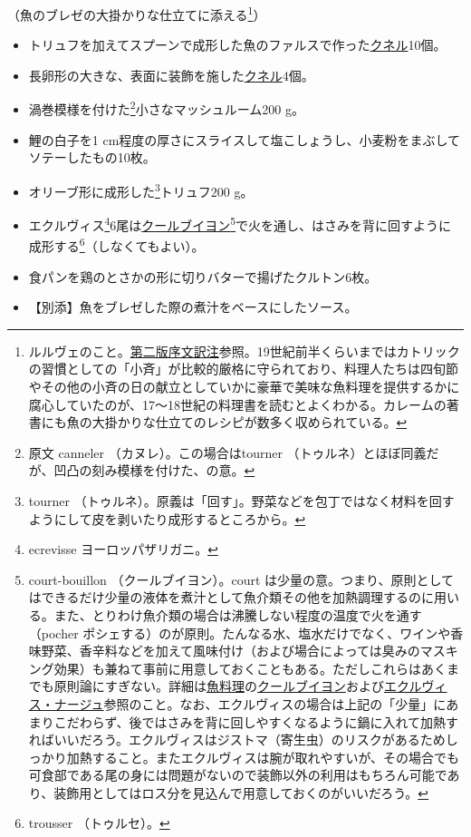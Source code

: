 \begin{recette}


（魚のブレゼの大掛かりな仕立てに添える\footnote{ルルヴェのこと。\protect\hyperlink{releve}{第二版序文訳注}参照。19世紀前半くらいまではカトリックの習慣としての「小斉」が比較的厳格に守られており、料理人たちは四旬節やその他の小斉の日の献立としていかに豪華で美味な魚料理を提供するかに腐心していたのが、17〜18世紀の料理書を読むとよくわかる。カレームの著書にも魚の大掛かりな仕立てのレシピが数多く収められている。}）

\begin{itemize}
\item
  トリュフを加えてスプーンで成形した魚のファルスで作った\protect\hyperlink{quenelles}{クネル}10個。
\item
  長卵形の大きな、表面に装飾を施した\protect\hyperlink{quenelles}{クネル}4個。
\item
  渦巻模様を付けた\footnote{原文 canneler （カヌレ）。この場合はtourner
    （トゥルネ）とほぼ同義だが、凹凸の刻み模様を付けた、の意。}小さなマッシュルーム200
  g。
\item
  鯉の白子を1
  cm程度の厚さにスライスして塩こしょうし、小麦粉をまぶしてソテーしたもの10枚。
\item
  オリーブ形に成形した\footnote{tourner
    （トゥルネ）。原義は「回す」。野菜などを包丁ではなく材料を回すようにして皮を剥いたり成形するところから。}トリュフ200
  g。
\item
  エクルヴィス\footnote{ecrevisse ヨーロッパザリガニ。}6尾は\protect\hyperlink{courtbouillon-a}{クールブイヨン}\footnote{court-bouillon
    （クールブイヨン）。court
    は少量の意。つまり、原則としてはできるだけ少量の液体を煮汁として魚介類その他を加熱調理するのに用いる。また、とりわけ魚介類の場合は沸騰しない程度の温度で火を通す（pocher
    ポシェする）のが原則。たんなる水、塩水だけでなく、ワインや香味野菜、香辛料などを加えて風味付け（および場合によっては臭みのマスキング効果）も兼ねて事前に用意しておくこともある。ただしこれらはあくまでも原則論にすぎない。詳細は\protect\hyperlink{poissons}{魚料理}の\protect\hyperlink{serie-de-courts-bouillons-de-poisson}{クールブイヨン}および\protect\hyperlink{ecrevisse-nage}{エクルヴィス・ナージュ}参照のこと。なお、エクルヴィスの場合は上記の「少量」にあまりこだわらず、後ではさみを背に回しやすくなるように鍋に入れて加熱すればいいだろう。エクルヴィスはジストマ（寄生虫）のリスクがあるためしっかり加熱すること。またエクルヴィスは腕が取れやすいが、その場合でも可食部である尾の身には問題がないので装飾以外の利用はもちろん可能であり、装飾用としてはロス分を見込んで用意しておくのがいいだろう。}で火を通し、はさみを背に回すように成形する\footnote{trousser
    （トゥルセ）。}（しなくてもよい）。
\item
  食パンを鶏のとさかの形に切りバターで揚げたクルトン6枚。
\item
  【別添】魚をブレゼした際の煮汁をベースにしたソース。
\end{itemize}


\end{recette}
